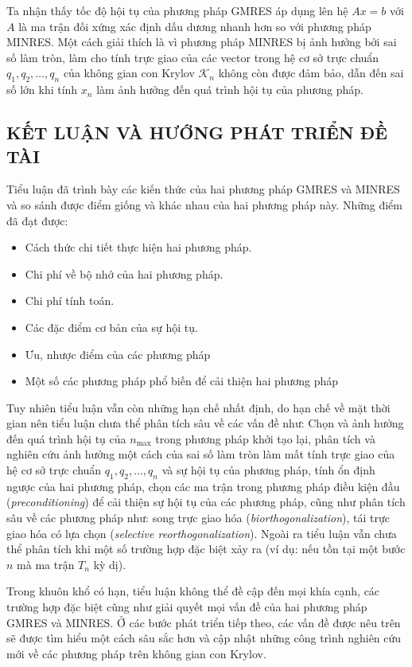 \documentclass[14pt, a4paper]{article}
\numberwithin{equation}{section}
\numberwithin{algorithm}{section}
\numberwithin{figure}{section}
\numberwithin{dl}{section}
\numberwithin{md}{section}
\numberwithin{bd}{section}
\numberwithin{dn}{section}
\numberwithin{hq}{section}
\begin{document}
Ta nhận thấy tốc độ hội tụ của phương pháp GMRES áp dụng lên hệ $Ax=b$ với $A$ là ma trận đối xứng xác định dấu dương nhanh hơn so với phương pháp MINRES. Một cách giải thích là vì phương pháp MINRES bị ảnh hưởng bởi sai số làm tròn, làm cho tính trực giao của các vector trong hệ cơ sở trực chuẩn $q_1, q_2, \dots, q_n$ của không gian con Krylov $\mathcal{K}_n$ không còn được đảm bảo, dẫn đến sai số lớn khi tính $x_n$ làm ảnh hưởng đến quá trình hội tụ của phương pháp.


\newpage
\begin{center}
    \section*{KẾT LUẬN VÀ HƯỚNG PHÁT TRIỂN ĐỀ TÀI}
\end{center}

Tiểu luận đã trình bày các kiến thức của hai phương pháp GMRES và MINRES và so sánh được điểm giống và khác nhau của hai phương pháp này.
Những điểm đã đạt được:

\begin{itemize}
    \item Cách thức chi tiết thực hiện hai phương pháp.
    \item Chi phí về bộ nhớ của hai phương pháp.
    \item Chi phí tính toán.
    \item Các đặc điểm cơ bản của sự hội tụ.
    \item Ưu, nhược điểm của các phương pháp
    \item Một số các phương pháp phổ biến để cải thiện hai phương pháp
\end{itemize}

Tuy nhiên tiểu luận vẫn còn những hạn chế nhất định, do hạn chế về mặt thời gian nên tiểu luận chưa thể phân tích sâu về các vấn đề như: Chọn và ảnh hưởng đến quá trình hội tụ của $n_{\max}$ trong phương pháp khởi tạo lại, phân tích và nghiên cứu ảnh hưởng một cách của sai số làm tròn làm mất tính trực giao của hệ cơ sở trực chuẩn $q_1, q_2, \dots, q_n$ và sự hội tụ của phương pháp, tính ổn định ngược của hai phương pháp, chọn các ma trận trong phương pháp điều kiện đầu (\textit{preconditioning}) để cải thiện sự hội tụ của các phương pháp,
cũng như phân tích sâu về các phương pháp như: song trực giao hóa (\textit{biorthogonalization}), tái trực giao hóa có lựa chọn (\textit{selective reorthogonalization}).
Ngoài ra tiểu luận vẫn chưa thể phân tích khi một số trường hợp đặc biệt xảy ra (ví dụ: nếu tồn tại một bước $n$ mà ma trận $T_n$ kỳ dị).

Trong khuôn khổ có hạn, tiểu luận không thể đề cập đến mọi khía cạnh, các trường hợp đặc biệt cũng như giải quyết mọi vấn đề của hai phương pháp GMRES và MINRES. Ở các bước phát triển tiếp theo, các vấn đề được nêu trên sẽ được tìm hiểu một cách sâu sắc hơn và cập nhật những công trình nghiên cứu mới về các phương pháp trên không gian con Krylov.
\newpage
{}
%
%
\printbibliography[title={TÀI LIỆU THAM KHẢO}]

\end{document}
